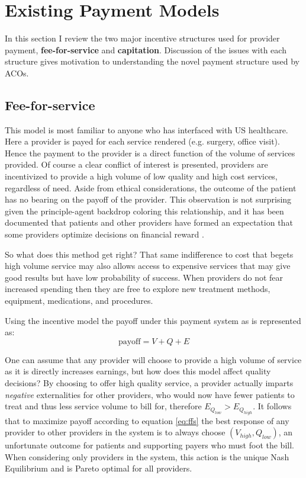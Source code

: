 \documentclass{article}
\begin{document}
\section{Existing Payment Models}
In this section I review the two major incentive structures used for provider payment, \textbf{fee-for-service} and \textbf{capitation}. Discussion of the issues with each structure gives motivation to understanding the novel payment structure used by ACOs.

\subsection{Fee-for-service}
This model is most familiar to anyone who has interfaced with US healthcare. Here a provider is payed for each service rendered (e.g. surgery, office visit). Hence the payment to the provider is a direct function of the volume of services provided. Of course a clear conflict of interest is presented, providers are incentivized to provide a high volume of low quality and high cost services, regardless of need. Aside from ethical considerations, the outcome of the patient has no bearing on the payoff of the provider. This observation is not surprising given the principle-agent backdrop coloring this relationship, and it has been documented that patients and other providers have formed an expectation that some providers optimize decisions on financial reward \cite{econharvard}\cite{overtreat}.

So what does this method get right? That same indifference to cost that begets high volume service may also allows access to expensive services that may give good results but have low probability of success. When providers do not fear increased spending then they are free to explore new treatment methods, equipment, medications, and procedures.

Using the incentive model the payoff under this payment system as is represented as:
\begin{equation} \label{eq:ffs}
    \text{payoff} = V + Q + E
\end{equation}

One can assume that any provider will choose to provide a high volume of service as it is directly increases earnings, but how does this model affect quality decisions? By choosing to offer high quality service, a provider actually imparts \emph{negative} externalities for other providers, who would now have fewer patients to treat and thus less service volume to bill for, therefore $E_{Q_{low}} > E_{Q_{high}}$. It follows that to maximize payoff according to equation \ref{eq:ffs} the best response of any provider to other providers in the system is to always choose $(V_{high}, Q_{low})$, an unfortunate outcome for patients and supporting payers who must foot the bill. When considering only providers in the system, this action is the unique Nash Equilibrium \cite{blended} and is Pareto optimal for all providers.
\end{document}
